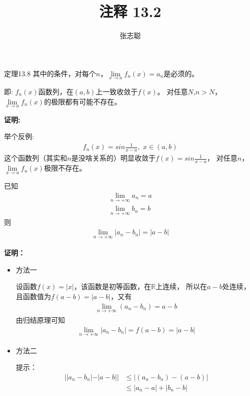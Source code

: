 \documentclass{article}
\begin{document}
\title{注释 13.2}
\author{张志聪}
\maketitle

\begin{zremark}
  定理13.8 其中的条件，对每个$n$，$\lim\limits_{x \to a} f_n(x) = a_n$是必须的。

  即:
  ${f_n(x)}$函数列，在$(a,b)$上一致收敛于$f(x)$。
  对任意$N$,$n > N$，$\lim\limits_{x \to a} f_n(x)$的极限都有可能不存在。
\end{zremark}
\textbf{证明:}

举个反例:
\begin{align*}
  f_n(x) = sin \frac{1}{x - a}, \, \, x \in (a, b)
\end{align*}
这个函数列（其实和$n$是没啥关系的）明显收敛于$f(x) = sin \frac{1}{x - a}$，
对任意$n$，$\lim\limits_{x \to a} f_n(x)$极限不存在。

\begin{zremark}
  已知
  \begin{align*}
    \lim\limits_{n \to +\infty} a_n = a \\
    \lim\limits_{n \to +\infty} b_n = b
  \end{align*}
  则
  \begin{align*}
    \lim\limits_{n \to +\infty} |a_n - b_n| = |a - b|
  \end{align*}
\end{zremark}
\textbf{证明：}
\begin{itemize}
  \item 方法一

        设函数$f(x) = |x|$，该函数是初等函数，在$\mathbb{R}$上连续，
        所以在$a - b$处连续，且函数值为$f(a-b) = |a - b|$，又有
        \begin{align*}
          \lim\limits_{n \to +\infty} (a_n - b_n) = a - b
        \end{align*}
        由归结原理可知
        \begin{align*}
          \lim\limits_{n \to +\infty} |a_n - b_n| = f(a - b) = |a - b|
        \end{align*}

  \item 方法二

        提示：
        \begin{align*}
          ||a_n - b_n| - |a - b||
           & \leq |(a_n - b_n) - (a - b)| \\
           & \leq |a_n - a| + |b_n - b|
        \end{align*}
\end{itemize}
\end{document}
